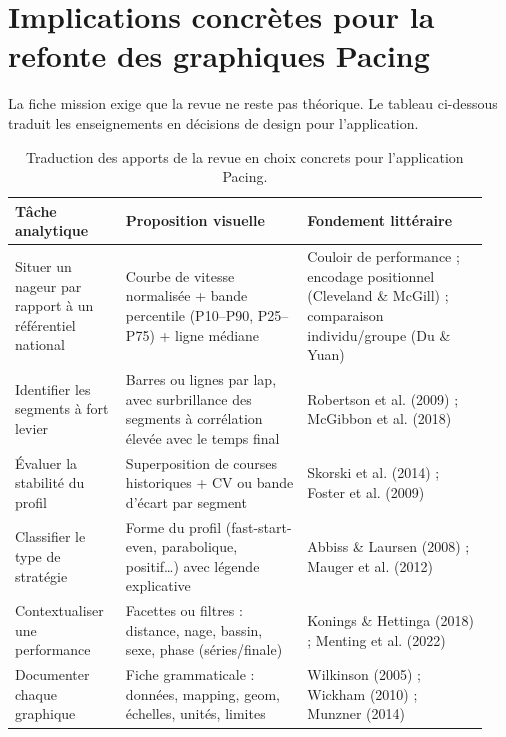 \documentclass[11pt,a4paper]{article}
\begin{document}
\section{Implications concrètes pour la refonte des graphiques Pacing}

La fiche mission exige que la revue ne reste pas théorique. Le tableau ci-dessous traduit les enseignements en décisions de design pour l'application.

\begin{table}[h!]
\centering
\small
\begin{tabular}{p{0.22\linewidth}p{0.36\linewidth}p{0.36\linewidth}}
\toprule
\textbf{Tâche analytique} & \textbf{Proposition visuelle} & \textbf{Fondement littéraire} \\
\midrule
Situer un nageur par rapport à un référentiel national & Courbe de vitesse normalisée + bande percentile (P10--P90, P25--P75) + ligne médiane & Couloir de performance ; encodage positionnel (Cleveland \& McGill) ; comparaison individu/groupe (Du \& Yuan) \\
\addlinespace
Identifier les segments à fort levier & Barres ou lignes par lap, avec surbrillance des segments à corrélation élevée avec le temps final & Robertson et al. (2009) ; McGibbon et al. (2018) \\
\addlinespace
Évaluer la stabilité du profil & Superposition de courses historiques + CV ou bande d'écart par segment & Skorski et al. (2014) ; Foster et al. (2009) \\
\addlinespace
Classifier le type de stratégie & Forme du profil (fast-start-even, parabolique, positif\ldots) avec légende explicative & Abbiss \& Laursen (2008) ; Mauger et al. (2012) \\
\addlinespace
Contextualiser une performance & Facettes ou filtres : distance, nage, bassin, sexe, phase (séries/finale) & Konings \& Hettinga (2018) ; Menting et al. (2022) \\
\addlinespace
Documenter chaque graphique & Fiche grammaticale : données, mapping, geom, échelles, unités, limites & Wilkinson (2005) ; Wickham (2010) ; Munzner (2014) \\
\bottomrule
\end{tabular}
\caption{Traduction des apports de la revue en choix concrets pour l'application Pacing.}
\end{table}
\end{document}
